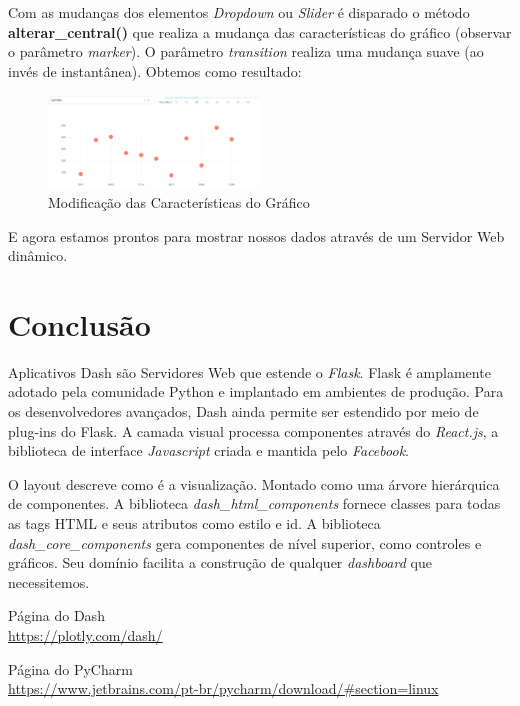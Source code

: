 \documentclass[a4paper,11pt]{article}
\begin{document}
Com as mudanças dos elementos \textit{Dropdown} ou \textit{Slider} é disparado o método \textbf{alterar\_central()} que realiza a mudança das características do gráfico (observar o parâmetro \textit{marker}). O parâmetro \textit{transition} realiza uma mudança suave (ao invés de instantânea). Obtemos como resultado:
\begin{figure}[H]
	\centering
	\includegraphics[width=0.5\textwidth]{imagem/interacao}
	\caption{Modificação das Características do Gráfico}
\end{figure}

E agora estamos prontos para mostrar nossos dados através de um Servidor Web dinâmico.

\section{Conclusão}
Aplicativos Dash são Servidores Web que estende o \textit{Flask}. Flask é amplamente adotado pela comunidade Python e implantado em ambientes de produção. Para os desenvolvedores avançados, Dash ainda permite ser estendido por meio de plug-ins do Flask. A camada visual processa componentes através do \textit{React.js}, a biblioteca de interface \textit{Javascript} criada e mantida pelo \textit{Facebook}. 

O layout descreve como é a visualização. Montado como uma árvore hierárquica de componentes. A biblioteca \textit{dash\_html\_components} fornece classes para todas as tags HTML e seus atributos como estilo e id. A biblioteca \textit{dash\_core\_components} gera componentes de nível superior, como controles e gráficos. Seu domínio facilita a construção de qualquer \textit{dashboard} que necessitemos.



\begin{thebibliography}{4}
	Página do Dash \\
	\url{https://plotly.com/dash/}

	Página do PyCharm \\
	\url{https://www.jetbrains.com/pt-br/pycharm/download/#section=linux}
	
	
\end{thebibliography}
\end{document}
